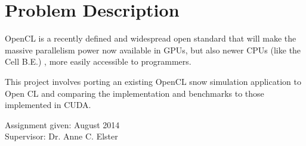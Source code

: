 \section*{Problem Description}
OpenCL is a recently defined and widespread open standard that will make the massive parallelism power now available in GPUs, but also newer CPUs (like the Cell B.E.) , more easily accessible to programmers.

This project involves porting an existing OpenCL snow simulation application to Open CL and comparing the implementation and benchmarks to those implemented in CUDA.\\[2cm]

\begin{center}
Assignment given: August 2014\\[1pc]
Supervisor: Dr. Anne C. Elster
\end{center}